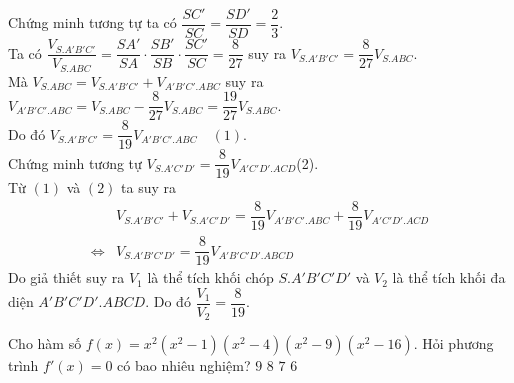 \begin{ex}
{	Chứng minh tương tự ta có $\dfrac{SC'}{SC} = \dfrac{SD'}{SD} =  \dfrac{2}{3}$.\\
	Ta có $\dfrac{V_{S.A'B'C'}}{V_{S.ABC}} = \dfrac{SA'}{SA}\cdot \dfrac{SB'}{SB}\cdot \dfrac{SC'}{SC} = \dfrac{8}{27}$ suy ra $V_{S.A'B'C'} = \dfrac{8}{27}V_{S.ABC}$.\\ 
	Mà $V_{S.ABC} = V_{S.A'B'C'} + V_{A'B'C'.ABC}$ suy ra $V_{A'B'C'.ABC} = V_{S.ABC} - \dfrac{8}{27}V_{S.ABC} = \dfrac{19}{27}V_{S.ABC}$.\\
	Do đó $V_{S.A'B'C'} = \dfrac{8}{19}V_{A'B'C'.ABC}\quad (1)$.\\
	Chứng minh tương tự $V_{S.A'C'D'} = \dfrac{8}{19}V_{A'C'D'.ACD}$\quad (2).\\
	Từ $(1)$ và $(2)$ ta suy ra 
		\begin{align*}
	{ }&V_{S.A'B'C'} + V_{S.A'C'D'} = \dfrac{8}{19}V_{A'B'C'.ABC} + \dfrac{8}{19}V_{A'C'D'.ACD}\\
	\Leftrightarrow &V_{S.A'B'C'D'} = \dfrac{8}{19}V_{A'B'C'D'.ABCD}
	\end{align*}
	Do giả thiết suy ra $V_{1}$ là thể tích khối chóp $S.A'B'C'D'$  và $V_{2}$ là thể tích khối đa diện $A'B'C'D'.ABCD$. Do đó $\dfrac{V_{1}}{V_{2}} = \dfrac{8}{19}$.
	}
\end{ex}


\begin{ex}%
Cho hàm số $f\left(x\right) = x^2\left(x^2 - 1\right)\left(x^2 - 4\right)\left(x^2 - 9\right)\left(x^2 - 16\right)$. Hỏi phương trình $f'\left(x\right) = 0$ có bao nhiêu nghiệm?
 	\choice
	{\True $9$}
	{$8$}
	{$7$}
	{$6$}
\end{ex}


